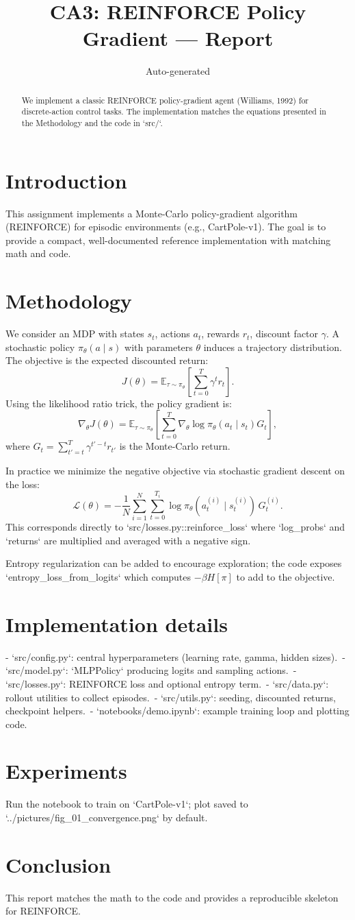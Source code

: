 \documentclass{article}
\title{CA3: REINFORCE Policy Gradient — Report}
\author{Auto-generated}
\begin{document}
\maketitle
\begin{abstract}
We implement a classic REINFORCE policy-gradient agent (Williams, 1992) for discrete-action control tasks. The implementation matches the equations presented in the Methodology and the code in `src/`.
\end{abstract}

\section{Introduction}
This assignment implements a Monte-Carlo policy-gradient algorithm (REINFORCE) for episodic environments (e.g., CartPole-v1). The goal is to provide a compact, well-documented reference implementation with matching math and code.

\section{Methodology}
We consider an MDP with states $s_t$, actions $a_t$, rewards $r_t$, discount factor $\gamma$. A stochastic policy $\pi_\theta(a\mid s)$ with parameters $\theta$ induces a trajectory distribution. The objective is the expected discounted return:
\[
J(\theta) = \mathbb{E}_{\tau\sim\pi_\theta}\left[\sum_{t=0}^{T} \gamma^t r_t\right].
\]
Using the likelihood ratio trick, the policy gradient is:
\[
\nabla_\theta J(\theta) = \mathbb{E}_{\tau\sim\pi_\theta}\left[\sum_{t=0}^T \nabla_\theta \log \pi_\theta(a_t\mid s_t) G_t\right],
\]
where $G_t=\sum_{t'=t}^T \gamma^{t'-t} r_{t'}$ is the Monte-Carlo return.

In practice we minimize the negative objective via stochastic gradient descent on the loss:
\[
\mathcal{L}(\theta) = -\frac{1}{N}\sum_{i=1}^N \sum_{t=0}^{T_i} \log \pi_\theta(a_t^{(i)}\mid s_t^{(i)})\,G_t^{(i)}.
\]
This corresponds directly to `src/losses.py::reinforce_loss` where `log_probs` and `returns` are multiplied and averaged with a negative sign.

Entropy regularization can be added to encourage exploration; the code exposes `entropy_loss_from_logits` which computes $-\beta H[\pi]$ to add to the objective.

\section{Implementation details}
- `src/config.py`: central hyperparameters (learning rate, gamma, hidden sizes).\
- `src/model.py`: `MLPPolicy` producing logits and sampling actions.\
- `src/losses.py`: REINFORCE loss and optional entropy term.\
- `src/data.py`: rollout utilities to collect episodes.\
- `src/utils.py`: seeding, discounted returns, checkpoint helpers.\
- `notebooks/demo.ipynb`: example training loop and plotting code.

\section{Experiments}
Run the notebook to train on `CartPole-v1`; plot saved to `../pictures/fig_01_convergence.png` by default.

\section{Conclusion}
This report matches the math to the code and provides a reproducible skeleton for REINFORCE.
\end{document}
